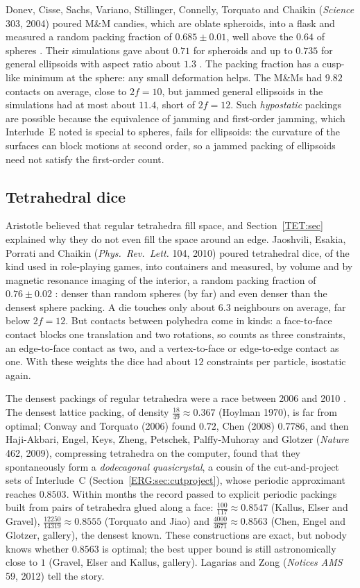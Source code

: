 \documentclass[11pt,openany]{book}
\theoremstyle{plain}
\theoremstyle{definition}
\theoremstyle{remark}
\begin{document}
Donev, Cisse, Sachs, Variano, Stillinger, Connelly, Torquato and Chaikin (\emph{Science} 303, 2004) poured
M\&M candies, which are oblate spheroids, into a flask and measured a random packing fraction of
$0.685\pm0.01$, well above the $0.64$ of spheres . Their simulations gave about $0.71$ for
spheroids and up to $0.735$ for general ellipsoids with aspect ratio about $1.3$ .
The packing fraction has a cusp-like minimum at the sphere: any small deformation helps. The M\&Ms had
$9.82$ contacts on average, close to $2f=10$, but jammed general ellipsoids in the simulations had at most
about $11.4$, short of $2f=12$. Such \emph{hypostatic} packings are possible because the equivalence of jamming and first-order jamming,
which Interlude~E noted is special to spheres, fails for ellipsoids: the curvature of the surfaces can
block motions at second order, so a jammed packing of ellipsoids need not satisfy the first-order count.

\subsection*{Tetrahedral dice}
Aristotle believed that regular tetrahedra fill space, and Section~\ref{TET:sec} explained why they do not
even fill the space around an edge. Jaoshvili, Esakia, Porrati and Chaikin (\emph{Phys.\ Rev.\ Lett.} 104,
2010) poured tetrahedral dice, of the kind used in role-playing games, into containers and
measured, by volume and by magnetic resonance imaging of the interior, a random packing fraction of
$0.76\pm0.02$ : denser than random spheres (by far) and even denser than the densest
sphere packing. A die touches only about $6.3$ neighbours on average, far below $2f=12$. But contacts between
polyhedra come in kinds: a face-to-face contact blocks one translation and two rotations, so counts as three
constraints, an edge-to-face contact as two, and a vertex-to-face or edge-to-edge contact as one. With these
weights the dice had about $12$ constraints per particle, isostatic again.

The densest packings of regular tetrahedra were a race between 2006 and 2010 . The densest
lattice packing, of density $\frac{18}{49}\approx0.367$ (Hoylman 1970), is far from optimal; Conway and
Torquato (2006) found $0.72$, Chen (2008) $0.7786$, and then Haji-Akbari, Engel, Keys, Zheng, Petschek, Palffy-Muhoray and
Glotzer (\emph{Nature} 462, 2009), compressing tetrahedra on the computer, found that they
spontaneously form a \emph{dodecagonal quasicrystal}, a cousin of the cut-and-project sets of Interlude~C
(Section~\ref{ERG:sec:cutproject}), whose periodic approximant reaches $0.8503$. Within months the record
passed to explicit periodic packings built from pairs of tetrahedra glued along a face: $\frac{100}{117}\approx0.8547$
(Kallus, Elser and Gravel), $\frac{12250}{14319}\approx0.8555$ (Torquato and Jiao) and
$\frac{4000}{4671}\approx0.8563$ (Chen, Engel and Glotzer, gallery), the densest known. These constructions are exact,
but nobody knows whether $0.8563$ is optimal; the best upper bound is still astronomically close to $1$
(Gravel, Elser and Kallus, gallery). Lagarias and Zong (\emph{Notices AMS} 59, 2012) tell the story.
\end{document}
